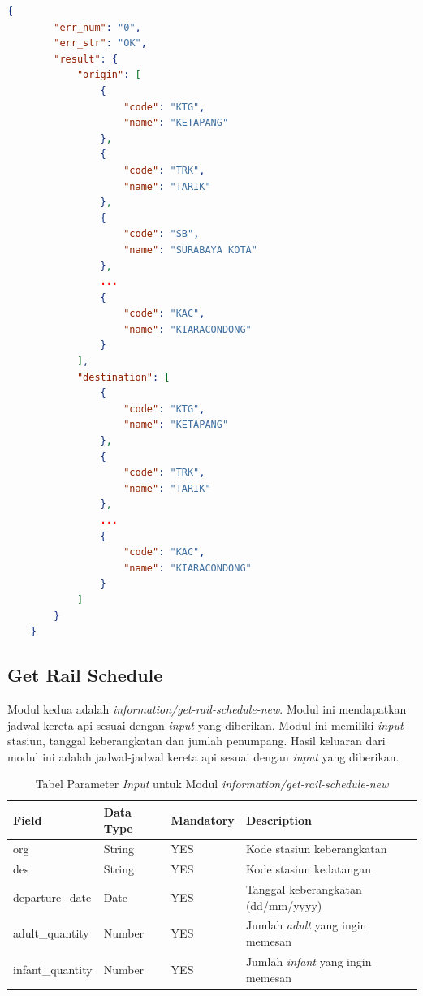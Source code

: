 \begin{lstlisting}[language=json]
    {
        "err_num": "0",
        "err_str": "OK",
        "result": {
            "origin": [
                {
                    "code": "KTG",
                    "name": "KETAPANG"
                },
                {
                    "code": "TRK",
                    "name": "TARIK"
                },
                {
                    "code": "SB",
                    "name": "SURABAYA KOTA"
                },
                ...
                {
                    "code": "KAC",
                    "name": "KIARACONDONG"
                }
            ],
            "destination": [
                {
                    "code": "KTG",
                    "name": "KETAPANG"
                },
                {
                    "code": "TRK",
                    "name": "TARIK"
                },
                ...
                {
                    "code": "KAC",
                    "name": "KIARACONDONG"
                }
            ]
        }
    }
\end{lstlisting}

\subsection{Get Rail Schedule}
\label{subsec:getrailschedule}

Modul kedua adalah \textit{information/get-rail-schedule-new}. Modul ini mendapatkan jadwal kereta api sesuai dengan \textit{input} yang diberikan. Modul ini memiliki \textit{input} stasiun, tanggal keberangkatan dan jumlah penumpang. Hasil keluaran dari modul ini adalah jadwal-jadwal kereta api sesuai dengan \textit{input} yang diberikan.

\begin{table}[H]
	\centering 
	\caption{Tabel Parameter \textit{Input} untuk Modul \textit{information/get-rail-schedule-new}}
	\label{tab:getrailscheduleinput}
	\begin{tabular}{|l|l|l|l|}
		\hline
		Field & Data Type & Mandatory & Description\\
		\hline
		
		\hline
        org & String & YES & Kode stasiun keberangkatan\\
        \hline
        des & String & YES & Kode stasiun kedatangan\\
        \hline
        departure\_date & Date & YES & Tanggal keberangkatan (dd/mm/yyyy)\\
        \hline
        adult\_quantity & Number & YES & Jumlah \textit{adult} yang ingin memesan\\
        \hline
        infant\_quantity & Number & YES & Jumlah \textit{infant} yang ingin memesan\\
        \hline
	\end{tabular} 
\end{table}

